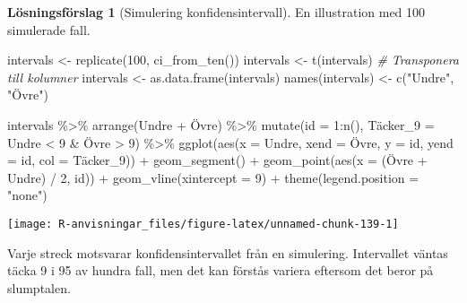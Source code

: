 \documentclass[
]{book}
\newenvironment{Shaded}{\begin{snugshade}}{\end{snugshade}}
\newcommand{\AttributeTok}[1]{\textcolor[rgb]{0.77,0.63,0.00}{#1}}
\newcommand{\CommentTok}[1]{\textcolor[rgb]{0.56,0.35,0.01}{\textit{#1}}}
\newcommand{\DecValTok}[1]{\textcolor[rgb]{0.00,0.00,0.81}{#1}}
\newcommand{\FunctionTok}[1]{\textcolor[rgb]{0.00,0.00,0.00}{#1}}
\newcommand{\NormalTok}[1]{#1}
\newcommand{\OtherTok}[1]{\textcolor[rgb]{0.56,0.35,0.01}{#1}}
\newcommand{\SpecialCharTok}[1]{\textcolor[rgb]{0.00,0.00,0.00}{#1}}
\newcommand{\StringTok}[1]{\textcolor[rgb]{0.31,0.60,0.02}{#1}}
\theoremstyle{definition}
\theoremstyle{definition}
\theoremstyle{definition}
\theoremstyle{definition}
\newtheorem{hypothesis}{Lösningsförslag}[chapter]
\theoremstyle{remark}
\begin{document}
\begin{hypothesis}[Simulering konfidensintervall]
En illustration med 100 simulerade fall.

\begin{Shaded}
\begin{Highlighting}[]
\NormalTok{intervals }\OtherTok{\textless{}{-}} \FunctionTok{replicate}\NormalTok{(}\DecValTok{100}\NormalTok{, }\FunctionTok{ci\_from\_ten}\NormalTok{())}
\NormalTok{intervals }\OtherTok{\textless{}{-}} \FunctionTok{t}\NormalTok{(intervals) }\CommentTok{\# Transponera till kolumner}
\NormalTok{intervals }\OtherTok{\textless{}{-}} \FunctionTok{as.data.frame}\NormalTok{(intervals)}
\FunctionTok{names}\NormalTok{(intervals) }\OtherTok{\textless{}{-}} \FunctionTok{c}\NormalTok{(}\StringTok{"Undre"}\NormalTok{, }\StringTok{"Övre"}\NormalTok{)}

\NormalTok{intervals }\SpecialCharTok{\%\textgreater{}\%} 
  \FunctionTok{arrange}\NormalTok{(Undre }\SpecialCharTok{+}\NormalTok{ Övre) }\SpecialCharTok{\%\textgreater{}\%} 
  \FunctionTok{mutate}\NormalTok{(}\AttributeTok{id =} \DecValTok{1}\SpecialCharTok{:}\FunctionTok{n}\NormalTok{(),}
\NormalTok{         Täcker}\AttributeTok{\_9 =}\NormalTok{ Undre }\SpecialCharTok{\textless{}} \DecValTok{9} \SpecialCharTok{\&}\NormalTok{ Övre }\SpecialCharTok{\textgreater{}} \DecValTok{9}\NormalTok{) }\SpecialCharTok{\%\textgreater{}\%} 
  \FunctionTok{ggplot}\NormalTok{(}\FunctionTok{aes}\NormalTok{(}\AttributeTok{x =}\NormalTok{ Undre, }\AttributeTok{xend =}\NormalTok{ Övre, }\AttributeTok{y =}\NormalTok{ id, }\AttributeTok{yend =}\NormalTok{ id, }\AttributeTok{col =}\NormalTok{ Täcker\_9)) }\SpecialCharTok{+}
  \FunctionTok{geom\_segment}\NormalTok{() }\SpecialCharTok{+}
  \FunctionTok{geom\_point}\NormalTok{(}\FunctionTok{aes}\NormalTok{(}\AttributeTok{x =}\NormalTok{ (Övre }\SpecialCharTok{+}\NormalTok{ Undre) }\SpecialCharTok{/} \DecValTok{2}\NormalTok{, id)) }\SpecialCharTok{+}
  \FunctionTok{geom\_vline}\NormalTok{(}\AttributeTok{xintercept =} \DecValTok{9}\NormalTok{) }\SpecialCharTok{+}
  \FunctionTok{theme}\NormalTok{(}\AttributeTok{legend.position =} \StringTok{"none"}\NormalTok{)}
\end{Highlighting}
\end{Shaded}

\begin{center}\texttt{[image: R-anvisningar\_files/figure-latex/unnamed-chunk-139-1]} \end{center}

Varje streck motsvarar konfidensintervallet från en simulering. Intervallet väntas täcka 9 i 95 av hundra fall, men det kan förstås variera eftersom det beror på slumptalen.
\end{hypothesis}
\end{document}
